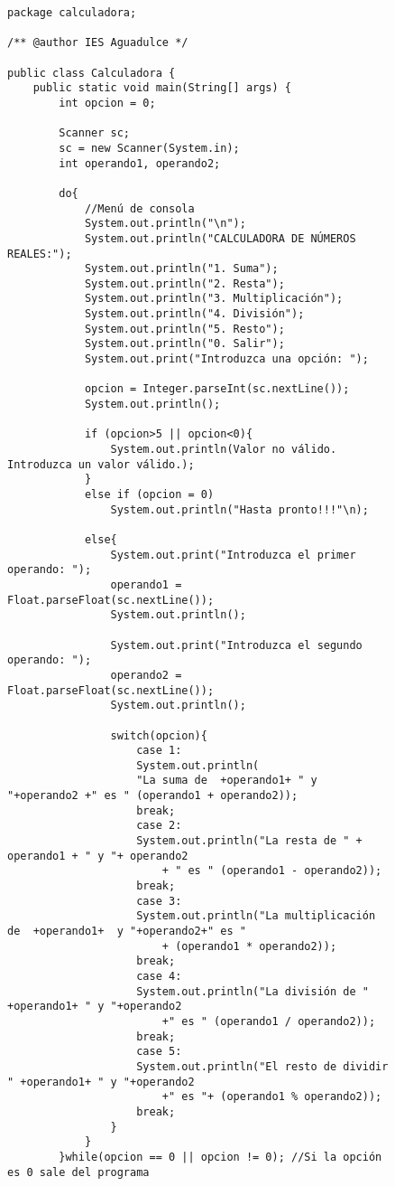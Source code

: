\begin{figure}[H]
    \begin{tcolorbox}[sharp corners, colback=yellow!30, colframe=white!20]
        \tiny
        \begin{verbatim}
package calculadora;

/** @author IES Aguadulce */

public class Calculadora {
    public static void main(String[] args) {
        int opcion = 0;

        Scanner sc;
        sc = new Scanner(System.in);
        int operando1, operando2;

        do{
            //Menú de consola
            System.out.println("\n");
            System.out.println("CALCULADORA DE NÚMEROS REALES:");
            System.out.println("1. Suma");
            System.out.println("2. Resta");
            System.out.println("3. Multiplicación");
            System.out.println("4. División");
            System.out.println("5. Resto");
            System.out.println("0. Salir");
            System.out.print("Introduzca una opción: ");

            opcion = Integer.parseInt(sc.nextLine());
            System.out.println();

            if (opcion>5 || opcion<0){
                System.out.println(Valor no válido. Introduzca un valor válido.);
            }
            else if (opcion = 0)
                System.out.println("Hasta pronto!!!"\n);

            else{
                System.out.print("Introduzca el primer operando: ");
                operando1 = Float.parseFloat(sc.nextLine());
                System.out.println();

                System.out.print("Introduzca el segundo operando: ");
                operando2 = Float.parseFloat(sc.nextLine());
                System.out.println();

                switch(opcion){
                    case 1:
                    System.out.println(
                    "La suma de  +operando1+ " y "+operando2 +" es " (operando1 + operando2));
                    break;
                    case 2:
                    System.out.println("La resta de " + operando1 + " y "+ operando2
                        + " es " (operando1 - operando2));
                    break;
                    case 3:
                    System.out.println("La multiplicación de  +operando1+  y "+operando2+" es "
                        + (operando1 * operando2));
                    break;
                    case 4:
                    System.out.println("La división de " +operando1+ " y "+operando2
                        +" es " (operando1 / operando2));
                    break;
                    case 5:
                    System.out.println("El resto de dividir " +operando1+ " y "+operando2
                        +" es "+ (operando1 % operando2));
                    break;
                }
            }
        }while(opcion == 0 || opcion != 0); //Si la opción es 0 sale del programa


\end{verbatim}
\end{tcolorbox}
\end{figure}
